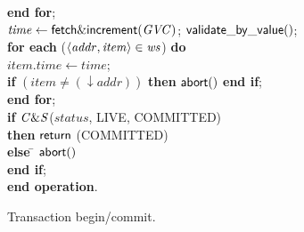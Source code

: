\begin{figure} [htb]
{{\begin{minipage}[t]{1\linewidth}
\begin{tabbing}
 \> {\bf end for}; \\

 \> $\mathit{time} \gets {\sf fetch\&increment}(\mathit{GVC})$; ${\sf validate\_by\_value}()$; \\



 \> 
{\bf for each} ($\left \langle \mathit{addr, item} \right \rangle  \in \mathit{ws}$) {\bf do} \\
 \>\> $\mathit{item.time} \gets \mathit{time}$; \\
 \>\> {\bf if} $(\mathit{item} \neq (\downarrow \mathit{addr}))$  
                 {\bf then}  
                   ${\sf abort}()$ 
                {\bf end if}; \\

 \> {\bf end for}; \\
 \> {\bf if} ${\sf \mathit{C\&S}}$($\mathit{status}$, LIVE, COMMITTED) \\
 \>\> {\bf then} \> ${\sf return}$ (COMMITTED)\\
 \> \> {\bf else} \= ${\sf abort}()$ \\
 \> {\bf end if};  \\
{\bf end operation}.

\end{tabbing}
\normalsize
\end{minipage}
}
\caption{Transaction begin/commit.}
\label{fig:tbc}
}
\end{figure}

